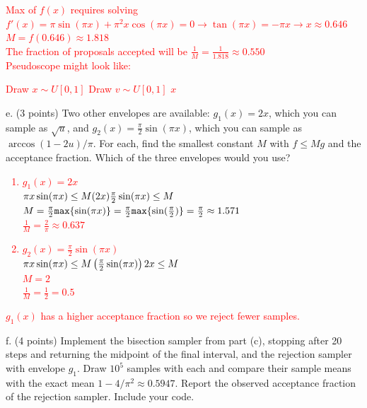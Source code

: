 \documentclass[11pt]{article}
\begin{document}
\textcolor{red}{
Max of $f(x)$ requires solving $f'(x) = \pi\sin(\pi x) + \pi^2 x \cos(\pi x) = 0 \rightarrow \tan(\pi x) = -\pi x \rightarrow x \approx 0.646$\\
$M = f(0.646) \approx 1.818$\\
The fraction of proposals accepted will be $\frac{1}{M} = \frac{1}{1.818} \approx 0.550$\\
Pseudoscope might look like:\\
\begin{algorithm}[H]
\caption{Rejection Sampling Loop}
    \begin{algorithmic}[1]
        \Loop
            \State Draw $x \sim U[0, 1]$
            \State Draw $v \sim U[0, 1]$
                \State \Return $x$
            \EndIf
        \EndLoop
    \end{algorithmic}
\end{algorithm}
}

e. (3 points) Two other envelopes are available: $g_1(x)=2x$, which you can sample as $\sqrt{u}$, and $g_2(x)=\frac{\pi}{2}\sin(\pi x)$, which you can sample as $\arccos(1-2u)/\pi$.  For each, find the smallest constant $M$ with $f\le Mg$ and the acceptance fraction.  Which of the three envelopes would you use?
\textcolor{red}{
\begin{enumerate}
    \item $g_1(x) = 2x$\\
    $\pi x \sin(\pi x) \le M (2x)\\
    \frac{\pi}{2} \sin(\pi x) \le M$\\
    $M = \frac{\pi}{2} \texttt{max}\{\sin(\pi x)\}\\
    = \frac{\pi}{2} \texttt{max}\{\sin(\frac{\pi}{2})\} = \frac{\pi}{2} \approx 1.571$\\
    $\frac{1}{M} = \frac{2}{\pi} \approx 0.637$
    \item $g_2(x)=\frac{\pi}{2}\sin(\pi x)$\\
    $\pi x \sin(\pi x) \le M \left(\frac{\pi}{2}\sin(\pi x)\right)\\
    2x \le M$\\
    $M = 2$\\
    $\frac{1}{M} = \frac{1}{2} = 0.5$\\
\end{enumerate}
$g_1(x)$ has a higher acceptance fraction so we reject fewer samples.
}

f. (4 points) Implement the bisection sampler from part (c), stopping after 20 steps and returning the midpoint of the final interval, and the rejection sampler with envelope $g_1$.  Draw $10^5$ samples with each and compare their sample means with the exact mean $1-4/\pi^2\approx0.5947$. Report the observed acceptance fraction of the rejection sampler. Include your code.
\end{document}

